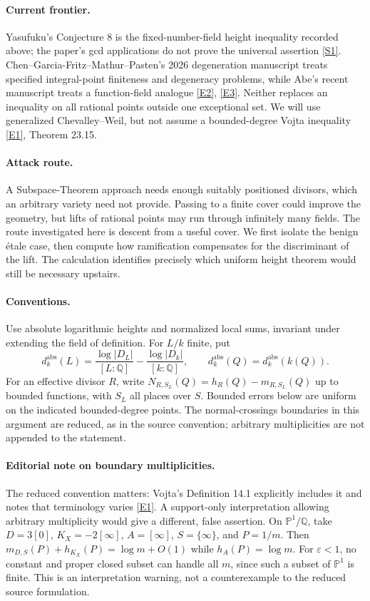 \documentclass[11pt,a4paper]{article}
\newcommand{\Q}{\mathbb{Q}}
\newcommand{\PP}{\mathbb P}
\newcommand{\eps}{\varepsilon}
\newcommand{\sref}[2]{\hyperlink{source:#1:#2}{[S#2]}}
\newcommand{\eref}[2]{\hyperlink{extra:#1:#2}{[E#2]}}
\numberwithin{equation}{section}
\begin{document}
\paragraph{Current frontier.}
Yasufuku's Conjecture 8 is the fixed-number-field height inequality recorded above; the paper's gcd applications do not prove the universal assertion \sref{64}{1}. Chen--Garcia-Fritz--Mathur--Pasten's 2026 degeneration manuscript treats specified integral-point finiteness and degeneracy problems, while Abe's recent manuscript treats a function-field analogue \eref{64}{2}, \eref{64}{3}. Neither replaces an inequality on all rational points outside one exceptional set. We will use generalized Chevalley--Weil, but not assume a bounded-degree Vojta inequality \eref{64}{1}, Theorem 23.15.

\paragraph{Attack route.}
A Subspace-Theorem approach needs enough suitably positioned divisors, which an arbitrary variety need not provide. Passing to a finite cover could improve the geometry, but lifts of rational points may run through infinitely many fields. The route investigated here is descent from a useful cover. We first isolate the benign étale case, then compute how ramification compensates for the discriminant of the lift. The calculation identifies precisely which uniform height theorem would still be necessary upstairs.

\paragraph{Conventions.}
Use absolute logarithmic heights and normalized local sums, invariant under extending the field of definition. For $L/k$ finite, put
\[
 d_k^{\mathrm{abs}}(L)=\frac{\log|D_L|}{[L:\Q]}-
                          \frac{\log|D_k|}{[k:\Q]},
 \qquad d_k^{\mathrm{abs}}(Q)=d_k^{\mathrm{abs}}(k(Q)).
\]
For an effective divisor $R$, write $N_{R,S_L}(Q)=h_R(Q)-m_{R,S_L}(Q)$ up to bounded functions, with $S_L$ all places over $S$. Bounded errors below are uniform on the indicated bounded-degree points. The normal-crossings boundaries in this argument are reduced, as in the source convention; arbitrary multiplicities are not appended to the statement.

\paragraph{Editorial note on boundary multiplicities.}
The reduced convention matters: Vojta's Definition 14.1 explicitly includes it and notes that terminology varies \eref{64}{1}. A support-only interpretation allowing arbitrary multiplicity would give a different, false assertion. On $\PP^1/\Q$, take $D=3[0]$, $K_X=-2[\infty]$, $A=[\infty]$, $S=\{\infty\}$, and $P=1/m$. Then $m_{D,S}(P)+h_{K_X}(P)=\log m+O(1)$ while $h_A(P)=\log m$. For $\eps<1$, no constant and proper closed subset can handle all $m$, since such a subset of $\PP^1$ is finite. This is an interpretation warning, not a counterexample to the reduced source formulation.
\end{document}
